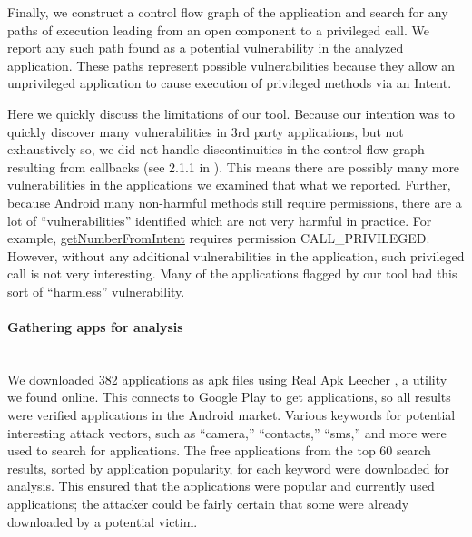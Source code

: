 \documentclass[12pt,a4paper]{article}
\begin{document}
Finally, we construct a control flow graph of the application and search for any
paths of execution leading from an open component to a privileged call. We
report any such path found as a potential vulnerability in the analyzed
application. These paths represent possible vulnerabilities because they allow
an unprivileged application to cause execution of privileged methods via an
Intent.

Here we quickly discuss the limitations of our tool. Because our intention was
to quickly discover many vulnerabilities in 3rd party applications, but not
exhaustively so, we did not handle discontinuities in the control flow graph
resulting from callbacks (see 2.1.1 in \cite{grace_systematic_2012}). This means
there are possibly many more vulnerabilities in the applications we examined
that what we reported. Further, because Android many non-harmful methods still
require permissions, there are a lot of ``vulnerabilities'' identified which are
not very harmful in practice. For example,
\href{https://developer.android.com/reference/android/telephony/PhoneNumberUtils.html#getNumberFromIntent\%28android.content.Intent,\%20android.content.Context\%29}{getNumberFromIntent}
requires permission CALL\_PRIVILEGED. However, without any additional
vulnerabilities in the application, such privileged call is not very
interesting. Many of the applications flagged by our tool had this sort of
``harmless'' vulnerability.

\paragraph{Gathering apps for analysis} ~\\
We downloaded 382 applications as apk files using Real Apk Leecher
\cite{apkleecher}, a utility we found online. This connects to Google Play to
get applications, so all results were verified applications in the Android
market. Various keywords for potential interesting attack vectors, such as
``camera,'' ``contacts,'' ``sms,'' and more were used to search for
applications. The free applications from the top 60 search results, sorted by
application popularity, for each keyword were downloaded for analysis.  This
ensured that the applications were popular and currently used applications; the
attacker could be fairly certain that some were already downloaded by a
potential victim.
\end{document}

